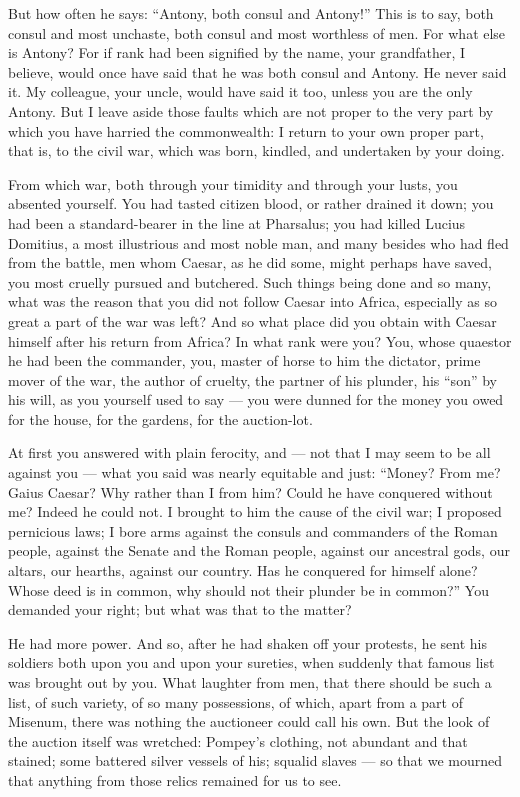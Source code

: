  But how often he says: ``Antony, both consul and Antony!'' This is to say, both consul and most unchaste, both consul and most worthless of men. For what else is Antony? For if rank had been signified by the name, your grandfather, I believe, would once have said that he was both consul and Antony. He never said it. My colleague, your uncle, would have said it too, unless you are the only Antony. But I leave aside those faults which are not proper to the very part by which you have harried the commonwealth: I return to your own proper part, that is, to the civil war, which was born, kindled, and undertaken by your doing.

 From which war, both through your timidity and through your lusts, you absented yourself. You had tasted citizen blood, or rather drained it down; you had been a standard-bearer in the line at Pharsalus; you had killed Lucius Domitius, a most illustrious and most noble man, and many besides who had fled from the battle, men whom Caesar, as he did some, might perhaps have saved, you most cruelly pursued and butchered. Such things being done and so many, what was the reason that you did not follow Caesar into Africa, especially as so great a part of the war was left? And so what place did you obtain with Caesar himself after his return from Africa? In what rank were you? You, whose quaestor he had been the commander, you, master of horse to him the dictator, prime mover of the war, the author of cruelty, the partner of his plunder, his ``son'' by his will, as you yourself used to say --- you were dunned for the money you owed for the house, for the gardens, for the auction-lot.

 At first you answered with plain ferocity, and --- not that I may seem to be all against you --- what you said was nearly equitable and just: ``Money? From me? Gaius Caesar? Why rather than I from him? Could he have conquered without me? Indeed he could not. I brought to him the cause of the civil war; I proposed pernicious laws; I bore arms against the consuls and commanders of the Roman people, against the Senate and the Roman people, against our ancestral gods, our altars, our hearths, against our country. Has he conquered for himself alone? Whose deed is in common, why should not their plunder be in common?'' You demanded your right; but what was that to the matter?

 He had more power. And so, after he had shaken off your protests, he sent his soldiers both upon you and upon your sureties, when suddenly that famous list was brought out by you. What laughter from men, that there should be such a list, of such variety, of so many possessions, of which, apart from a part of Misenum, there was nothing the auctioneer could call his own. But the look of the auction itself was wretched: Pompey's clothing, not abundant and that stained; some battered silver vessels of his; squalid slaves --- so that we mourned that anything from those relics remained for us to see.


